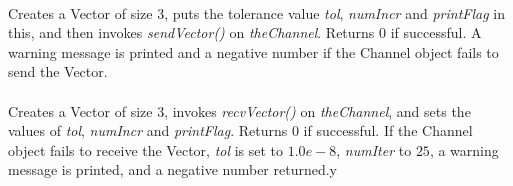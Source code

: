 \\ 
Creates a Vector of size 3, puts the tolerance value {\em tol}, {\em
numIncr} and {\em printFlag}
in this, and then invokes {\em sendVector()} on {\em
theChannel}. Returns $0$ if successful. A warning message is printed
and a negative number if the Channel object fails to send the Vector.\\ 

\\ 
Creates a Vector of size 3, invokes {\em recvVector()} on {\em
theChannel}, and sets the values of {\em tol}, {\em numIncr} and {\em printFlag}.
Returns $0$ if successful. If the Channel object fails to receive the
Vector, {\em tol} is set to $1.0e-8$, {\em numIter} to $25$, a warning
message is printed, and a negative number returned.y




